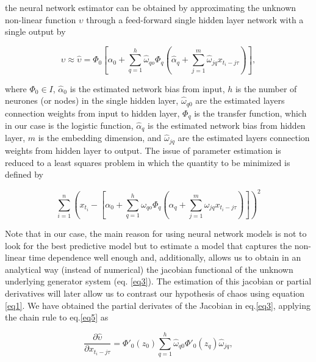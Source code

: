 \noindent the neural network estimator can be obtained by approximating the unknown non-linear function $\upsilon$ through a feed-forward single hidden layer network with a single output by

\begin{equation}
\upsilon  \approx \hat \upsilon  = {\Phi _0}\left[ {{{\hat \alpha }_0} + \sum\limits_{q = 1}^h {{{\hat \omega }_{qo}}{\Phi _q}\left( {{{\hat \alpha }_q} + \sum\limits_{j = 1}^m {{{\hat \omega }_{jq}}{x_{{t_i} - j\tau }}} } \right)} } \right],
\label{eq5}
\end{equation}

\noindent where ${\Phi _0} \in I$, ${{\hat \alpha }_0}$ is the estimated network bias from input, $h$ is the number of neurones (or nodes) in the single hidden layer, ${\hat \omega }_{q0}$ are the estimated layers connection weights from input to hidden layer, ${\Phi _q}$ is the transfer function, which in our case is the logistic function, ${{\hat \alpha }_q}$ is the estimated network bias from hidden layer, $m$ is the embedding dimension, and ${\hat \omega }_{jq}$ are the estimated layers connection weights from hidden layer to output. The issue of parameter estimation is reduced to a least squares problem in which the quantity to be minimized is defined by

\begin{equation*}
\sum\limits_{i = 1}^n {{{\left( {{x_{t_i}} - \left[ {{\alpha _0} + \sum\limits_{q = 1}^h {{\omega _{qo}}{\Phi _q}\left( {{\alpha _q} + \sum\limits_{j = 1}^m {{\omega _{jq}}{x_{{t_i} - j\tau }}} } \right)} } \right]} \right)}^2}} 
\end{equation*}

Note that in our case, the main reason for using neural network models is not to look for the best predictive model but to estimate a model that captures the non-linear time dependence well enough and, additionally, allows us to obtain in an analytical way (instead of numerical) the jacobian functional of the unknown underlying generator system (eq. \ref{eq3}). The estimation of this jacobian or partial derivatives will later allow us to contrast our hypothesis of chaos using equation \ref{eq1}. We have obtained the partial derivates of the Jacobian in eq.\ref{eq3}, applying the chain rule to eq.\ref{eq5} as

\begin{equation}
\frac{{\partial \hat \upsilon }}{{\partial {x_{{t_i} - j\tau }}}} = {{\Phi '}_0}\left( {{z_0}} \right)\sum\limits_{q = 1}^h {{{\hat \omega }_{q0}}} {{\Phi '}_0}\left( {{z_q}} \right){{\hat \omega }_{jq}},
\label{eq6}
\end{equation}

